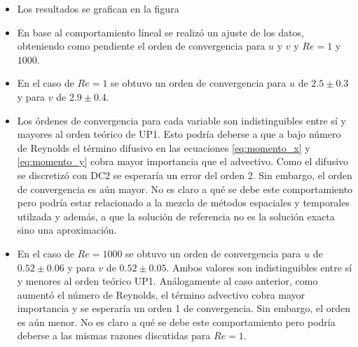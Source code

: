 \documentclass[aps,prb,twocolumn,superscriptaddress,floatfix,longbibliography,10pt]{revtex4-2}
\newcounter{para}
\begin{document}
\begin{itemize}
  \item Los resultados se grafican en la figura 
  \item En base al comportamiento lineal se realizó un ajuste de los datos, obteniendo como pendiente el orden de convergencia para $u$ y $v$ y $Re = 1$ y $1000$.
  \item En el caso de $Re = 1$ se obtuvo un orden de convergencia para $u$ de $2.5 \pm 0.3$ y para $v$ de $2.9 \pm 0.4$.
  \item Los órdenes de convergencia para cada variable son indistinguibles entre sí y mayores al orden teórico de UP1. Esto podría deberse a que a bajo número de Reynolds el término difusivo en las ecuaciones \ref{eq:momento_x} y \ref{eq:momento_y} cobra mayor importancia que el advectivo. Como el difusivo se discretizó con DC2 se esperaría un error del orden 2. Sin embargo, el orden de convergencia es aún mayor. No es claro a qué se debe este comportamiento pero podría estar relacionado a la mezcla de métodos espaciales y temporales utilzada y además, a que la solución de referencia no es la solución exacta sino una aproximación.
  \item En el caso de $Re = 1000$ se obtuvo un orden de convergencia para $u$ de $0.52 \pm 0.06$ y para $v$ de $0.52 \pm 0.05$. Ambos valores son indistinguibles entre sí y menores al orden teórico UP1. Análogamente al caso anterior, como aumentó el número de Reynolds, el término advectivo cobra mayor importancia y se esperaría un orden 1 de convergencia. Sin embargo, el orden es aún menor. No es claro a qué se debe este comportamiento pero podría deberse a las mismas razones discutidas para $Re = 1$.
\end{itemize}
\end{document}
